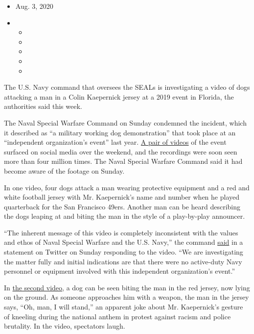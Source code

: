 \begin{itemize}
\item
  Aug. 3, 2020
\item
  \begin{itemize}
  \item
  \item
  \item
  \item
  \item
  \end{itemize}
\end{itemize}

The U.S. Navy command that oversees the SEALs is investigating a video
of dogs attacking a man in a Colin Kaepernick jersey at a 2019 event in
Florida, the authorities said this week.

The Naval Special Warfare Command on Sunday condemned the incident,
which it described as ``a military working dog demonstration'' that took
place at an ``independent organization's event'' last year.
\href{https://twitter.com/BillyCorben/status/1289961836264095744}{A pair
of videos} of the event surfaced on social media over the weekend, and
the recordings were soon seen more than four million times. The Naval
Special Warfare Command said it had become aware of the footage on
Sunday.

In one video, four dogs attack a man wearing protective equipment and a
red and white football jersey with Mr. Kaepernick's name and number when
he played quarterback for the San Francisco 49ers. Another man can be
heard describing the dogs leaping at and biting the man in the style of
a play-by-play announcer.

``The inherent message of this video is completely inconsistent with the
values and ethos of Naval Special Warfare and the U.S. Navy,'' the
command
\href{https://twitter.com/us_navyseals/status/1290034412218802176}{said}
in a statement on Twitter on Sunday responding to the video. ``We are
investigating the matter fully and initial indications are that there
were no active-duty Navy personnel or equipment involved with this
independent organization's event.''

In \href{https://twitter.com/BillyCorben/status/1289979415879798784}{the
second video}, a dog can be seen biting the man in the red jersey, now
lying on the ground. As someone approaches him with a weapon, the man in
the jersey says, ``Oh, man, I will stand,'' an apparent joke about Mr.
Kaepernick's gesture of kneeling during the national anthem in protest
against racism and police brutality. In the video, spectators laugh.

